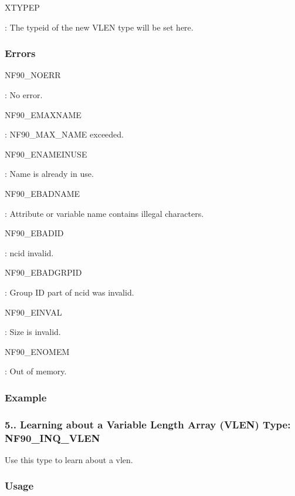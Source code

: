 {\ttfamily X\+T\+Y\+P\+EP}

\+: The typeid of the new V\+L\+EN type will be set here.

\subsubsection*{Errors}

{\ttfamily N\+F90\+\_\+\+N\+O\+E\+RR}

\+: No error.

{\ttfamily N\+F90\+\_\+\+E\+M\+A\+X\+N\+A\+ME}

\+: N\+F90\+\_\+\+M\+A\+X\+\_\+\+N\+A\+ME exceeded.

{\ttfamily N\+F90\+\_\+\+E\+N\+A\+M\+E\+I\+N\+U\+SE}

\+: Name is already in use.

{\ttfamily N\+F90\+\_\+\+E\+B\+A\+D\+N\+A\+ME}

\+: Attribute or variable name contains illegal characters.

{\ttfamily N\+F90\+\_\+\+E\+B\+A\+D\+ID}

\+: ncid invalid.

{\ttfamily N\+F90\+\_\+\+E\+B\+A\+D\+G\+R\+P\+ID}

\+: Group ID part of ncid was invalid.

{\ttfamily N\+F90\+\_\+\+E\+I\+N\+V\+AL}

\+: Size is invalid.

{\ttfamily N\+F90\+\_\+\+E\+N\+O\+M\+EM}

\+: Out of memory.

\subsubsection*{Example}\hypertarget{f90-user-defined-data-types_f90-learning-about-a-variable-length-array-vlen-type-nf90_inq_vlen}{}\subsubsection{5.. Learning about a Variable Length Array (\+V\+L\+E\+N) Type\+: N\+F90\+\_\+\+I\+N\+Q\+\_\+\+V\+L\+EN}\label{f90-user-defined-data-types_f90-learning-about-a-variable-length-array-vlen-type-nf90_inq_vlen}
Use this type to learn about a vlen.

\subsubsection*{Usage}


